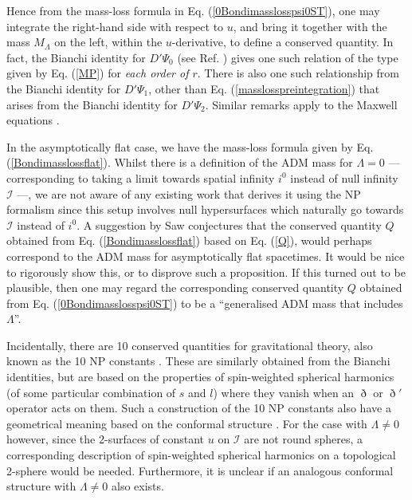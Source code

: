 \documentclass[aps,pre,preprint,superscriptaddress,showpacs,showkeys]{revtex4-1}
\begin{document}
Hence from the mass-loss formula in Eq. (\ref{0Bondimasslosspsi0ST}), one may integrate the right-hand side with respect to $u$, and bring it together with the mass $M_\Lambda$ on the left, within the $u$-derivative, to define a conserved quantity. In fact, the Bianchi identity for $D'\Psi_0$ (see Ref. \cite{Vee2016}) gives one such relation of the type given by Eq. (\ref{MP}) for \emph{each order of $r$}. There is also one such relationship from the Bianchi identity for $D'\Psi_1$, other than Eq. (\ref{masslosspreintegration}) that arises from the Bianchi identity for $D'\Psi_2$. Similar remarks apply to the Maxwell equations \cite{Vee2017}.

In the asymptotically flat case, we have the mass-loss formula given by Eq. (\ref{Bondimasslossflat}). Whilst there is a definition of the ADM mass for $\Lambda=0$ \cite{adm,ADMDDD,200years,Poisson} --- corresponding to taking a limit towards spatial infinity $i^0$ instead of null infinity $\mathcal{I}$ ---, we are not aware of any existing work that derives it using the NP formalism since this setup involves null hypersurfaces which naturally go towards $\mathcal{I}$ instead of $i^0$. A suggestion by Saw \cite{Vee2016} conjectures that the conserved quantity $Q$ obtained from Eq. (\ref{Bondimasslossflat}) based on Eq. (\ref{Q}), would perhaps correspond to the ADM mass for asymptotically flat spacetimes. It would be nice to rigorously show this, or to disprove such a proposition. If this turned out to be plausible, then one may regard the corresponding conserved quantity $Q$ obtained from Eq. (\ref{0Bondimasslosspsi0ST}) to be a ``generalised ADM mass that includes $\Lambda$''.

Incidentally, there are 10 conserved quantities for gravitational theory, also known as the 10 NP constants \cite{newpen65a,newpen68,exton}. These are similarly obtained from the Bianchi identities, but are based on the properties of spin-weighted spherical harmonics (of some particular combination of $s$ and $l$) where they vanish when an $\eth$ or $\eth'$ operator acts on them. Such a construction of the 10 NP constants also have a geometrical meaning based on the conformal structure \cite{newpen68}. For the case with $\Lambda\neq0$ however, since the 2-surfaces of constant $u$ on $\mathcal{I}$ are not round spheres, a corresponding description of spin-weighted spherical harmonics on a topological 2-sphere would be needed. Furthermore, it is unclear if an analogous conformal structure with $\Lambda\neq0$ also exists.
\end{document}
